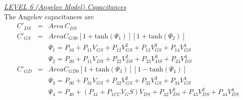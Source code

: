 \noindent\underline{\sl LEVEL 6 (Angelov Model) Capacitances}\\[0.1in]
The Angelov capacitances are
\begin{eqnarray}
C'_{DS}&=&Area\, C_{DS} \\
C'_{GS}&=&Area C_{GS0} \left[ 1 + \mbox{tanh} (\Psi_1) \right]
                       \left[ 1 + \mbox{tanh} (\Psi_2) \right]\\
&&\Psi_1 = P_{10}+P_{11}V_{GS}+P_{12}V_{GS}^2+P_{13}V_{GS}^3+P_{14}V_{GS}^4\\
&&\Psi_2 = P_{20}+P_{11}V_{DS}+P_{22}V_{DS}^2+P_{23}V_{DS}^3+P_{24}V_{DS}^4\\
C'_{GD}&=&Area C_{GD0} \left[ 1 + \mbox{tanh} (\Psi_3) \right]
                       \left[ 1 - \mbox{tanh} (\Psi_4) \right]\\
&&\Psi_3 = P_{30}+P_{31}V_{GS}+P_{32}V_{GS}^2+P_{33}V_{GS}^3+P_{34}V_{GS}^4\\
&&\Psi_4 = P_{40}+    \left( P_{41}+P_{1CC} V_GS \right) V_{DS}
         + P_{42}V_{DS}^2+P_{43}V_{DS}^3+P_{44}V_{DS}^4
\end{eqnarray}

